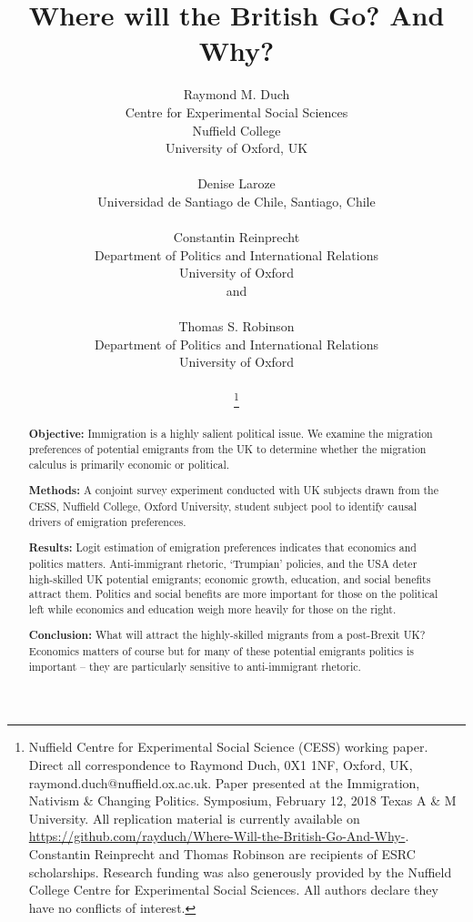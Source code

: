 \documentclass[12pt]{article}
\title{{\bf Where will the British Go? And Why?}}
\author{Raymond M. Duch \\Centre for Experimental Social Sciences\\ Nuffield College \\ University of Oxford, UK \\ \\ Denise Laroze \\ Universidad de Santiago de Chile, Santiago, Chile \\ \\Constantin Reinprecht \\ Department of Politics and International Relations \\ University of Oxford \\ and \\ \\ 
Thomas S. Robinson \\ Department of Politics and International Relations \\ University of Oxford \\ \\
\thanks{ Nuffield Centre for Experimental Social Science (CESS) working paper. Direct all correspondence to Raymond Duch,  0X1 1NF, Oxford, UK, raymond.duch@nuffield.ox.ac.uk. Paper presented at the Immigration, Nativism \& Changing Politics. Symposium, February 12, 2018 Texas A \& M University. All replication material is currently available on \url{https://github.com/rayduch/Where-Will-the-British-Go-And-Why-}. Constantin Reinprecht and Thomas Robinson are recipients of ESRC scholarships. Research funding was also generously provided by the Nuffield College Centre for Experimental Social Sciences.  All authors declare they have no conflicts of interest. }
\\ 
}
\newcommand{\absdiv}[1]{
  \par\addvspace{.5\baselineskip}
  \noindent\textbf{#1}\quad\ignorespaces
}
\begin{document}
\begin{singlespace}
\maketitle




\end{singlespace}

\pagebreak

\begin{center}
\end{center}


\vspace{1cm}

\begin{abstract}

\absdiv{Objective:} Immigration is a highly salient political issue. %
We examine the migration preferences of potential emigrants from the UK to determine whether the migration calculus is primarily economic or political. 

\absdiv{Methods:} A conjoint survey experiment conducted with UK subjects drawn from the CESS, Nuffield College, Oxford University, student subject pool to identify causal drivers of emigration preferences.  

\absdiv{Results:} Logit estimation of emigration preferences indicates that economics and politics matters. Anti-immigrant rhetoric, `Trumpian’ policies, and the USA deter high-skilled UK potential emigrants; economic growth, education, and social benefits attract them. Politics and social benefits are more important for those on the political left while economics and education weigh more heavily for those on the right. 

\absdiv{Conclusion:} What will attract the highly-skilled migrants from a post-Brexit UK? Economics matters of course but for many of these potential emigrants politics is important -- they are particularly sensitive to anti-immigrant rhetoric.


\end{abstract}
\doublespacing


\newpage
\end{document}
